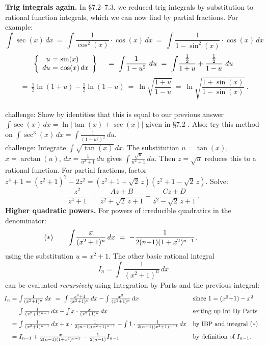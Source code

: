 \documentclass[11pt]{article}
\begin{document}
\noindent
{\bf Trig integrals again.}  In \S7.2--7.3, we reduced trig integrals by substitution 
to rational function integrals, which we can now find by partial fractions.
For example:
$$
\int\!\sec(x)\,dx 
\ =\
\int\! \frac{1}{\cos^2(x)}\cdot \cos(x)\,dx 
\ =\
\int\! \frac{1}{1-\sin^2(x)}\cdot\cos(x)\,dx
$$
$$
\left\{\begin{array}{r@{\ }c@{\ }l} u &=& \sin(x) \\ du &=& \cos(x)\,dx\end{array}\right\}
\quad
\ =\
\int\! \frac1{1-u^2}\ du
\ =\
\int\!\frac{\tfrac12}{1+u} + \frac{\tfrac12}{1-u}\ du
$$
$$
\ =\
\tfrac12\ln(1{+}u)-\tfrac12\ln(1{-}u)
\ =\
\ln  \sqrt{\frac{1{+}u}{1{-}u}}
\ =\
\ln  \sqrt{\frac{1{+}\sin(x)}{1{-}\sin(x)}}\ .
$$
\\[.5em]
{\sc challenge:} Show by identities that this is equal to our previous answer 
$\int\sec(x)\,dx=\ln\!|\!\tan(x)+\sec(x)|$ given in \S7.2 .
Also: try this method on $\int\!\sec^3(x)\,dx=\int\!\! \frac{1}{(1-u^2)^2}\,du$.
\\[.5em]
{\sc challenge:}  Integrate $\int\! \sqrt{\tan(x)}\,dx$. 
The substitution $u=\tan(x)$, $x=\arctan(u)$, $dx = \frac1{u^2+1}\,du$ 
gives $\int\! \frac{\sqrt u}{u^2+1}\,du$. Then $z=\sqrt u$ reduces this to a rational function.
For partial fractions, factor $z^4+1=(z^2{+}1)^2-2z^2=(z^2+1+\sqrt2\, z)(z^2+1-\sqrt2\,z)$.
Solve:
$$%
\frac{z^2}{z^4+1} \ =\ \frac{Az+B}{z^2+\sqrt2\, z+1} + \frac{Cz+D}{z^2-\sqrt2\, z+1}\, .
$$
%
{\bf Higher quadratic powers.} For powers of irreducible quadratics in the denominator:
  $$
  \hspace{-.5in} (*) \qquad
 \int\!\frac{x}{(x^2 + 1)^n}\,dx \ =\ -\frac{1}{2(n{-}1)(1+x^2)^{n-1}},
 $$
using the substitution $u=x^2+1$. 
The other basic rational integral
$$
I_n=\int\!\frac{1}{(x^2 + 1)^n}\,dx
$$ 
can be evaluated {\it recursively} using Integration by Parts and the previous integral:
$$\hspace{-.1in} 
\begin{array}{r@{\ }ll}
I_n =&   \int\!\frac{1}{(x^2 + 1)^n}\,dx 
\ =\ 
\int \frac{x^2 + 1}{(x^2 + 1)^n}\,dx 
- \int \frac{x^2}{(x^2 + 1)^n}\,dx 
& \text{since} \ 1 = (x^2{+}1) -x^2
\\[.8em]
=&
\int \frac{1}{(x^2 + 1)^{n-1}}\,dx 
- \int x\cdot\frac{x}{(x^2 + 1)^n}\,dx 
& \text{setting up Int By Parts}
\\[.8em]
=&
\int \frac{1}{(x^2 + 1)^{n-1}}\,dx 
 + x\cdot \frac{1}{2(n-1)(x^2 + 1)^{n-1}} 
 -  \int 1\cdot \frac{1}{2(n-1)(x^2 + 1)^{n-1}}\,dx
& \text{by IBP and  integral $(*)$}
\\[.8em]
=&
 I_{n-1} + \frac{x}{2(n-1)(1+x^2)^{n-1}} - \frac{1}{2(n-1)}I_{n-1}
& \text{by definition of $I_{n-1}$.}
\end{array}$$
\end{document}
